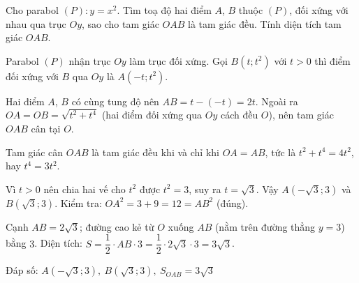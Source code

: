 \begin{problem}[9DS-HSB2-046]
Cho parabol $(P)\colon y = x^2$. Tìm toạ độ hai điểm $A$, $B$ thuộc $(P)$, đối xứng với nhau qua trục $Oy$, sao cho tam giác $OAB$ là tam giác đều. Tính diện tích tam giác $OAB$.

\begin{solution}
Parabol $(P)$ nhận trục $Oy$ làm trục đối xứng. Gọi $B(t; t^2)$ với $t > 0$ thì điểm đối xứng với $B$ qua $Oy$ là $A(-t; t^2)$.

Hai điểm $A$, $B$ có cùng tung độ nên $AB = t - (-t) = 2t$. Ngoài ra $OA = OB = \sqrt{t^2 + t^4}$ (hai điểm đối xứng qua $Oy$ cách đều $O$), nên tam giác $OAB$ cân tại $O$.

Tam giác cân $OAB$ là tam giác đều khi và chỉ khi $OA = AB$, tức là $t^2 + t^4 = 4t^2$, hay $t^4 = 3t^2$.

Vì $t > 0$ nên chia hai vế cho $t^2$ được $t^2 = 3$, suy ra $t = \sqrt{3}$. Vậy $A\left(-\sqrt{3}; 3\right)$ và $B\left(\sqrt{3}; 3\right)$. Kiểm tra: $OA^2 = 3 + 9 = 12 = AB^2$ (đúng).

Cạnh $AB = 2\sqrt{3}$; đường cao kẻ từ $O$ xuống $AB$ (nằm trên đường thẳng $y = 3$) bằng $3$. Diện tích: $S = \dfrac{1}{2} \cdot AB \cdot 3 = \dfrac{1}{2} \cdot 2\sqrt{3} \cdot 3 = 3\sqrt{3}$.

Đáp số: $\boxed{A\left(-\sqrt{3}; 3\right),\ B\left(\sqrt{3}; 3\right),\ S_{OAB} = 3\sqrt{3}}$
\end{solution}
\end{problem}

